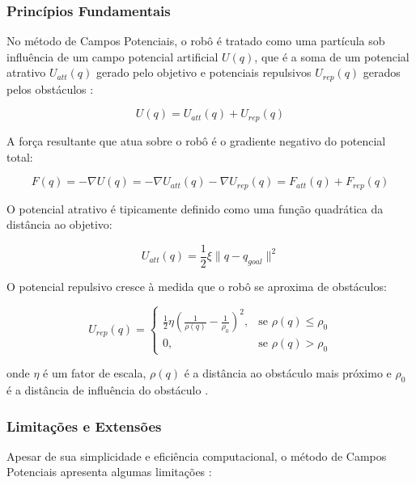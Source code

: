 \subsubsection{Princípios Fundamentais}

No método de Campos Potenciais, o robô é tratado como uma partícula sob influência de um campo potencial artificial $U(q)$, que é a soma de um potencial atrativo $U_{att}(q)$ gerado pelo objetivo e potenciais repulsivos $U_{rep}(q)$ gerados pelos obstáculos \cite{Khatib1986, Siegwart2011}:

\begin{equation}
U(q) = U_{att}(q) + U_{rep}(q)
\end{equation}

A força resultante que atua sobre o robô é o gradiente negativo do potencial total:

\begin{equation}
F(q) = -\nabla U(q) = -\nabla U_{att}(q) - \nabla U_{rep}(q) = F_{att}(q) + F_{rep}(q)
\end{equation}

O potencial atrativo é tipicamente definido como uma função quadrática da distância ao objetivo:

\begin{equation}
U_{att}(q) = \frac{1}{2} \xi \|q - q_{goal}\|^2
\end{equation}

O potencial repulsivo cresce à medida que o robô se aproxima de obstáculos:

\begin{equation}
U_{rep}(q) = 
\begin{cases}
\frac{1}{2} \eta \left(\frac{1}{\rho(q)} - \frac{1}{\rho_0}\right)^2, & \text{se } \rho(q) \leq \rho_0 \\
0, & \text{se } \rho(q) > \rho_0
\end{cases}
\end{equation}

onde $\eta$ é um fator de escala, $\rho(q)$ é a distância ao obstáculo mais próximo e $\rho_0$ é a distância de influência do obstáculo \cite{Khatib1986, Siegwart2011}.

\subsubsection{Limitações e Extensões}

Apesar de sua simplicidade e eficiência computacional, o método de Campos Potenciais apresenta algumas limitações \cite{Koren1991, Siegwart2011}:

